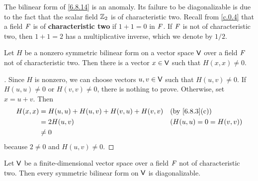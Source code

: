 \begin{note}
  The bilinear form of \cref{6.8.14} is an anomaly.
  Its failure to be diagonalizable is due to the fact that the scalar field \(\mathbb{Z}_2\) is of characteristic two.
  Recall from \cref{c.0.4} that a field \(\mathit{F}\) is of \textbf{characteristic two} if \(1 + 1 = 0\) in \(\mathit{F}\).
  If \(\mathit{F}\) is not of characteristic two, then \(1 + 1 = 2\) has a multiplicative inverse, which we denote by \(1 / 2\).
\end{note}

\begin{lem}\label{6.8.15}
  Let \(H\) be a nonzero symmetric bilinear form on a vector space \(\mathsf{V}\) over a field \(\mathit{F}\) not of characteristic two.
  Then there is a vector \(x \in \mathsf{V}\) such that \(H(x, x) \neq 0\).
\end{lem}

\begin{proof}[]
  Since \(H\) is nonzero, we can choose vectors \(u, v \in \mathsf{V}\) such that \(H(u, v) \neq 0\).
  If \(H(u, u) \neq 0\) or \(H(v, v) \neq 0\), there is nothing to prove.
  Otherwise, set \(x = u + v\).
  Then
  \begin{align*}
    H(x, x) & = H(u, u) + H(u, v) + H(v, u) + H(v, v) &  & \by{6.8.3}[c]           \\
            & = 2 H(u, v)                             &  & (H(u, u) = 0 = H(v, v)) \\
            & \neq 0
  \end{align*}
  because \(2 \neq 0\) and \(H(u, v) \neq 0\).
\end{proof}

\begin{thm}\label{6.35}
  Let \(\mathsf{V}\) be a finite-dimensional vector space over a field \(\mathit{F}\) not of characteristic two.
  Then every symmetric bilinear form on \(\mathsf{V}\) is diagonalizable.
\end{thm}

